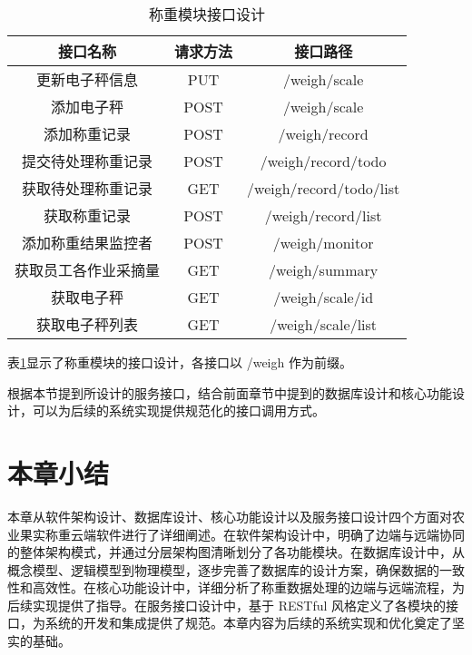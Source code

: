\begin{table}[H]
\centering
\caption{称重模块接口设计}
\label{tab:interface-weigh}
\begin{tabular}{|c|c|c|}
\hline
接口名称 & 请求方法 & 接口路径 \\\hline
更新电子秤信息 & PUT & /weigh/scale \\ \hline
添加电子秤 & POST & /weigh/scale \\\hline
添加称重记录 & POST & /weigh/record \\\hline
提交待处理称重记录 & POST & /weigh/record/todo \\\hline
获取待处理称重记录 & GET & /weigh/record/todo/list \\\hline
获取称重记录 & POST & /weigh/record/list \\\hline
添加称重结果监控者 & POST & /weigh/monitor \\\hline
获取员工各作业采摘量 & GET & /weigh/summary \\\hline
获取电子秤 & GET & /weigh/scale/{id} \\\hline
获取电子秤列表 & GET & /weigh/scale/list \\\hline
\end{tabular}
\end{table}

表\ref{tab:interface-weigh}显示了称重模块的接口设计，各接口以 /weigh 作为前缀。

根据本节提到所设计的服务接口，结合前面章节中提到的数据库设计和核心功能设计，可以为后续的系统实现提供规范化的接口调用方式。

\section{本章小结}

本章从软件架构设计、数据库设计、核心功能设计以及服务接口设计四个方面对农业果实称重云端软件进行了详细阐述。在软件架构设计中，明确了边端与远端协同的整体架构模式，并通过分层架构图清晰划分了各功能模块。在数据库设计中，从概念模型、逻辑模型到物理模型，逐步完善了数据库的设计方案，确保数据的一致性和高效性。在核心功能设计中，详细分析了称重数据处理的边端与远端流程，为后续实现提供了指导。在服务接口设计中，基于 RESTful 风格定义了各模块的接口，为系统的开发和集成提供了规范。本章内容为后续的系统实现和优化奠定了坚实的基础。
